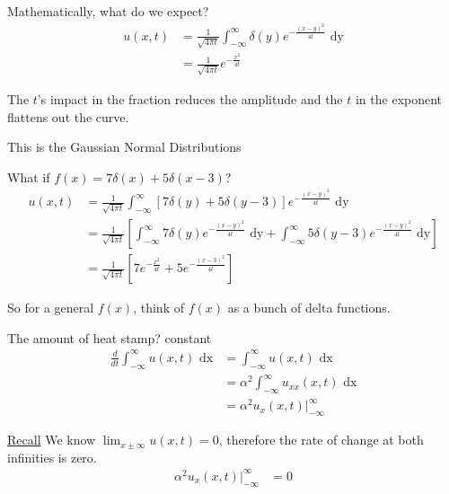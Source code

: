 \documentclass{article}
\begin{document}
Mathematically, what do we expect?
%
\begin{align}
  u(x, t) & = \frac{1}{\sqrt{4 \pi t}} \int^\infty_{-\infty} \delta(y) e^{- \frac{(x - y)^2}{4t}} \text{ dy}\\
  & = \frac{1}{\sqrt{4 \pi t}} e^{- \frac{x^2}{4 t}}
\end{align}

The $t$'s impact in the fraction reduces the amplitude and the $t$ in the exponent flattens out the curve.

This is the Gaussian Normal Distributions

What if $f(x) = 7 \delta(x) + 5 \delta(x - 3)$?
%
\begin{align}
  u(x, t) & = \frac{1}{\sqrt{4 \pi t}} \int^\infty_{-\infty} [7 \delta(y) + 5 \delta(y - 3)] e^{-\frac{(x - y)^2}{4 t}} \text{ dy}\\
  & = \frac{1}{\sqrt{4 \pi t}}
  \left[
    \int^\infty_{-\infty} 7 \delta(y) e^{- \frac{(x - y)^2}{4 t}} \text{ dy} +
    \int^\infty_{-\infty} 5 \delta(y - 3) e^{-\frac{(x - y)^2}{4t}} \text{ dy}
  \right]\\
  & = \frac{1}{\sqrt{4 \pi t}}
  \left[
    7e^{- \frac{x^2}{4 t}} + 5 e^{-\frac{(x - 3)^2}{4 t}}
  \right]
\end{align}

So for a general $f(x)$, think of $f(x)$ as a bunch of delta functions.


The amount of heat stamp? constant
%
\begin{align}
  \frac{d}{dt} \int^\infty_{-\infty} u(x, t) \text{ dx}
  & = \int^\infty_{-\infty} u(x, t) \text{ dx}\\
  & = \alpha^2 \int^\infty_{-\infty} u_{xx} (x, t) \text{ dx}\\
  & = \alpha^2 u_x(x, t) \Big|^\infty_{-\infty}
\end{align}

\underline{Recall} We know $\lim_{x \pm \infty} u(x, t) = 0$, therefore the rate of change at both infinities is zero.
%
\begin{align}
  \alpha^2 u_x(x, t) \Big|^\infty_{-\infty} & = 0
\end{align}
\end{document}
